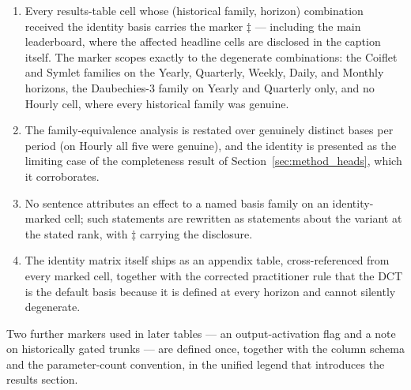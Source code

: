 \begin{enumerate}
\item Every results-table cell whose (historical family, horizon) combination
received the identity basis carries the marker $\ddagger$ --- including the
main leaderboard, where the affected headline cells are disclosed in the
caption itself. The marker scopes exactly to the degenerate combinations: the
Coiflet and Symlet families on the Yearly, Quarterly, Weekly, Daily, and
Monthly horizons, the Daubechies-3 family on Yearly and Quarterly only, and
no Hourly cell, where every historical family was genuine.
\item The family-equivalence analysis is restated over genuinely distinct
bases per period (on Hourly all five were genuine), and the identity is
presented as the limiting case of the completeness result of
Section~\ref{sec:method_heads}, which it corroborates.
\item No sentence attributes an effect to a named basis family on an
identity-marked cell; such statements are rewritten as statements about the
variant at the stated rank, with $\ddagger$ carrying the disclosure.
\item The identity matrix itself ships as an appendix table,
cross-referenced from every marked cell, together with the corrected
practitioner rule that the DCT is the default basis because it is defined at
every horizon and cannot silently degenerate.
\end{enumerate}

Two further markers used in later tables --- an output-activation flag and a
note on historically gated trunks --- are defined once, together with the
column schema and the parameter-count convention, in the unified legend that
introduces the results section.
